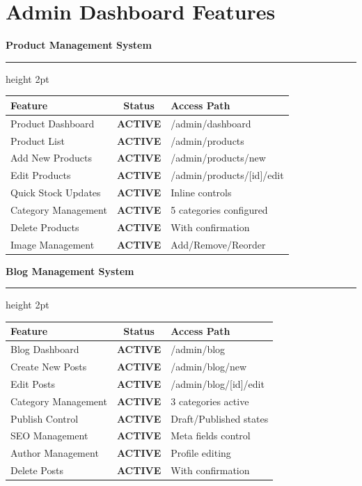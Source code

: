 \documentclass[11pt,a4paper]{article}
\newcommand{\sectionheader}[1]{%
    \vspace{0.5cm}
    {\Large\textbf{\textcolor{header-bg}{#1}}}
    \vspace{0.3cm}
    \hrule height 2pt
    \vspace{0.3cm}
}
\newcommand{\statusactive}{\colorbox{ispeak-green!20}{\textcolor{ispeak-green}{\textbf{ACTIVE}}}}
\begin{document}
\newpage

\section{Admin Dashboard Features}

\sectionheader{Product Management System}

\begin{tabularx}{\textwidth}{|X|c|X|}
\hline
\rowcolor{header-bg!10}
\textbf{Feature} & \textbf{Status} & \textbf{Access Path} \\
\hline
Product Dashboard & \statusactive & /admin/dashboard \\
\hline
Product List & \statusactive & /admin/products \\
\hline
Add New Products & \statusactive & /admin/products/new \\
\hline
Edit Products & \statusactive & /admin/products/[id]/edit \\
\hline
Quick Stock Updates & \statusactive & Inline controls \\
\hline
Category Management & \statusactive & 5 categories configured \\
\hline
Delete Products & \statusactive & With confirmation \\
\hline
Image Management & \statusactive & Add/Remove/Reorder \\
\hline
\end{tabularx}

\vspace{0.5cm}

\sectionheader{Blog Management System}

\begin{tabularx}{\textwidth}{|X|c|X|}
\hline
\rowcolor{header-bg!10}
\textbf{Feature} & \textbf{Status} & \textbf{Access Path} \\
\hline
Blog Dashboard & \statusactive & /admin/blog \\
\hline
Create New Posts & \statusactive & /admin/blog/new \\
\hline
Edit Posts & \statusactive & /admin/blog/[id]/edit \\
\hline
Category Management & \statusactive & 3 categories active \\
\hline
Publish Control & \statusactive & Draft/Published states \\
\hline
SEO Management & \statusactive & Meta fields control \\
\hline
Author Management & \statusactive & Profile editing \\
\hline
Delete Posts & \statusactive & With confirmation \\
\hline
\end{tabularx}
\end{document}
